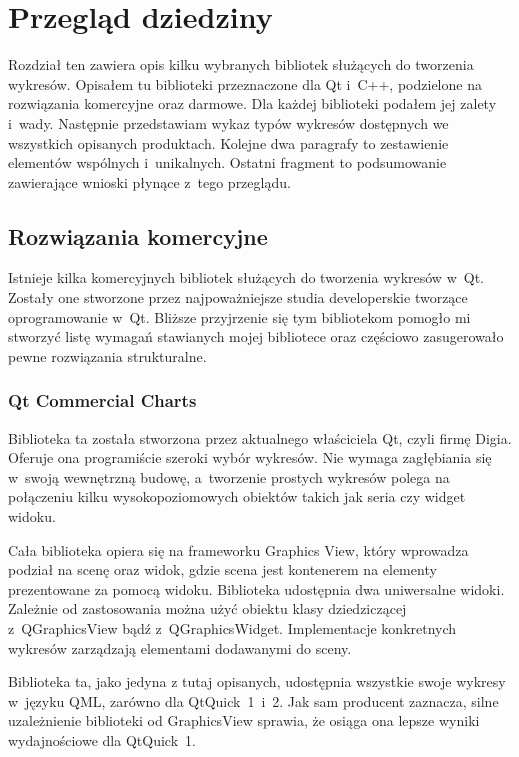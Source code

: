 \chapter{Przegląd dziedziny}
Rozdział ten zawiera opis kilku wybranych bibliotek służących do tworzenia wykresów. Opisałem tu  biblioteki przeznaczone dla Qt i~C++, podzielone na rozwiązania komercyjne oraz darmowe. Dla każdej biblioteki podałem jej zalety i~wady. Następnie przedstawiam wykaz typów wykresów dostępnych we wszystkich opisanych produktach. Kolejne dwa paragrafy to zestawienie elementów wspólnych i~unikalnych. Ostatni fragment to podsumowanie zawierające wnioski płynące z~tego przeglądu.

\section{Rozwiązania komercyjne}
Istnieje kilka komercyjnych bibliotek służących do tworzenia wykresów w~Qt. Zostały one stworzone przez najpoważniejsze studia developerskie tworzące oprogramowanie w~Qt. Bliższe przyjrzenie się tym bibliotekom pomogło mi stworzyć listę wymagań stawianych mojej bibliotece oraz częściowo zasugerowało pewne rozwiązania strukturalne.
 
\subsection{Qt Commercial Charts}
Biblioteka ta została stworzona przez aktualnego właściciela Qt, czyli firmę Digia. Oferuje ona programiście szeroki wybór wykresów. Nie wymaga zagłębiania się w~swoją wewnętrzną budowę, a~tworzenie prostych wykresów polega na połączeniu kilku wysokopoziomowych obiektów takich jak seria czy widget widoku.\newline

Cała biblioteka opiera się na frameworku Graphics View, który wprowadza podział na scenę oraz widok, gdzie scena jest kontenerem na elementy prezentowane za pomocą widoku.
Biblioteka udostępnia dwa uniwersalne widoki. Zależnie od zastosowania można użyć obiektu klasy dziedziczącej z~QGraphicsView bądź z~QGraphicsWidget. Implementacje konkretnych wykresów zarządzają elementami dodawanymi do sceny.\newline

Biblioteka ta, jako jedyna z tutaj opisanych, udostępnia wszystkie swoje wykresy w~języku QML, zarówno dla QtQuick~1~i~2.
Jak sam producent zaznacza, silne uzależnienie biblioteki od GraphicsView sprawia, że osiąga ona lepsze wyniki wydajnościowe dla QtQuick~1.\newline

